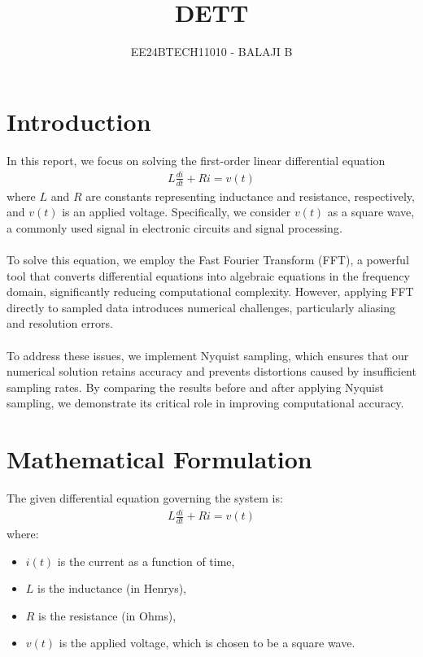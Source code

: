 \documentclass[journal]{IEEEtran}
\begin{document}

\vspace{3cm}

\title{DETT}
\author{EE24BTECH11010 - BALAJI B}
{\let\newpage\relax\maketitle}

\renewcommand{\thefigure}{\theenumi}
\renewcommand{\thetable}{\theenumi}
\setlength{\intextsep}{10pt} %


\renewcommand{\thetable}{\theenumi}

\section{Introduction}
In this report, we focus on solving the first-order linear differential equation
\begin{align}
    L \frac{di}{dt} + Ri = v(t)
\end{align}
where $L$ and $R$ are constants representing inductance and resistance, respectively, and $v(t)$ is an applied voltage. Specifically, we consider $v(t)$ as a square wave, a commonly used signal in electronic circuits and signal processing. \\ \\ 
To solve this equation, we employ the Fast Fourier Transform (FFT), a powerful tool that converts differential equations into algebraic equations in the frequency domain, significantly reducing computational complexity. However, applying FFT directly to sampled data introduces numerical challenges, particularly aliasing and resolution errors. \\ \\ 
To address these issues, we implement Nyquist sampling, which ensures that our numerical solution retains accuracy and prevents distortions caused by insufficient sampling rates. By comparing the results before and after applying Nyquist sampling, we demonstrate its critical role in improving computational accuracy.
\section{Mathematical Formulation}
The given differential equation governing the system is:
\begin{align}
    L \frac{di}{dt} + Ri = v(t)
\end{align}
where:
\begin{itemize}
    \item $i(t)$ is the current as a function of time,
    \item $L$ is the inductance (in Henrys),
    \item $R$ is the resistance (in Ohms),
    \item $v(t)$ is the applied voltage, which is chosen to be a square wave.
\end{itemize}
\end{document}
